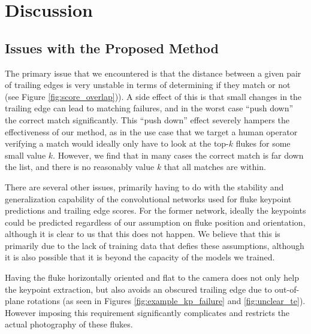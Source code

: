 
\chapter{Discussion} \label{sec:discussion}

\section{Issues with the Proposed Method}

The primary issue that we encountered is that the distance between a given pair of trailing edges is very unstable in terms of determining if they match or not (see Figure \ref{fig:score_overlap})).
A side effect of this is that small changes in the trailing edge can lead to matching failures, and in the worst case ``push down'' the correct match significantly.
This ``push down'' effect severely hampers the effectiveness of our method, as in the use case that we target a human operator verifying a match would ideally only have to look at the top-$k$ flukes for some small value $k$.
However, we find that in many cases the correct match is far down the list, and there is no reasonably value $k$ that all matches are within. %


There are several other issues, primarily having to do with the stability and generalization capability of the convolutional networks used for fluke keypoint predictions and trailing edge scores.
For the former network, ideally the keypoints could be predicted regardless of our assumption on fluke position and orientation, although it is clear to us that this does not happen.
We believe that this is primarily due to the lack of training data that defies these assumptions, although it is also possible that it is beyond the capacity of the models we trained.

Having the fluke horizontally oriented and flat to the camera does not only help the keypoint extraction, but also avoids an obscured trailing edge due to out-of-plane rotations (as seen in Figures \ref{fig:example_kp_failure} and \ref{fig:unclear_te}).
However imposing this requirement significantly complicates and restricts the actual photography of these flukes.

